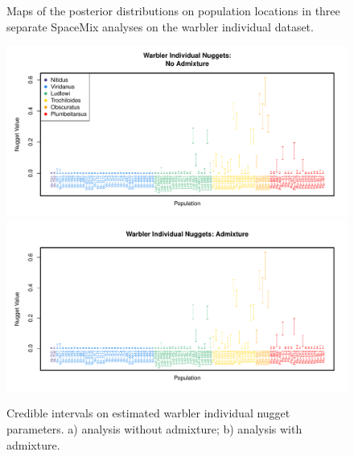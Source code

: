 \documentclass[10pt,letterpaper]{article}
\begin{document}
\begin{figure}
	\caption{Maps of the posterior distributions on population locations in three separate SpaceMix analyses on the warbler individual dataset.}\label{sfig:warb_ind_clouds}
\end{figure}

\begin{figure}
\centering
	\subcaptionbox{\label{warb_ind_noad_nugg}}
		{\includegraphics[width=\textwidth]{../figs/warblers/warb_ind_NoAd_nugget.pdf}}
	\subcaptionbox{\label{warb_ind_ad_nugg}}
		{\includegraphics[width=\textwidth]{../figs/warblers/warb_ind_Ad_nugget.pdf}}
	\caption{Credible intervals on estimated warbler individual nugget parameters.  a) analysis without admixture; b) analysis with admixture.}\label{sfig:warb_ind_nugg}
\end{figure}
\end{document}
